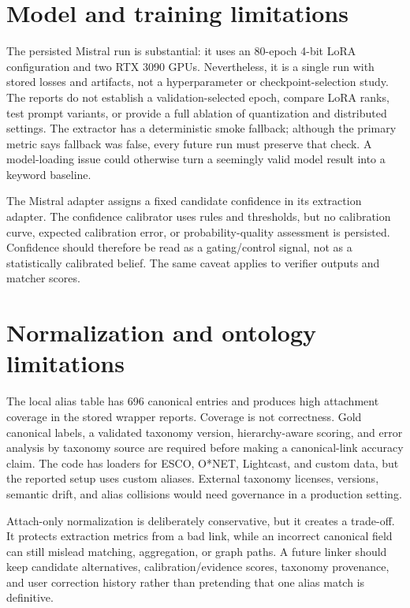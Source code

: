 \section{Model and training limitations}

The persisted Mistral run is substantial: it uses an 80-epoch 4-bit LoRA configuration and two RTX 3090 GPUs. Nevertheless, it is a single run with stored losses and artifacts, not a hyperparameter or checkpoint-selection study. The reports do not establish a validation-selected epoch, compare LoRA ranks, test prompt variants, or provide a full ablation of quantization and distributed settings. The extractor has a deterministic smoke fallback; although the primary metric says fallback was false, every future run must preserve that check. A model-loading issue could otherwise turn a seemingly valid model result into a keyword baseline.

The Mistral adapter assigns a fixed candidate confidence in its extraction adapter. The confidence calibrator uses rules and thresholds, but no calibration curve, expected calibration error, or probability-quality assessment is persisted. Confidence should therefore be read as a gating/control signal, not as a statistically calibrated belief. The same caveat applies to verifier outputs and matcher scores.

\section{Normalization and ontology limitations}

The local alias table has 696 canonical entries and produces high attachment coverage in the stored wrapper reports. Coverage is not correctness. Gold canonical labels, a validated taxonomy version, hierarchy-aware scoring, and error analysis by taxonomy source are required before making a canonical-link accuracy claim. The code has loaders for ESCO, O*NET, Lightcast, and custom data, but the reported setup uses custom aliases. External taxonomy licenses, versions, semantic drift, and alias collisions would need governance in a production setting.

Attach-only normalization is deliberately conservative, but it creates a trade-off. It protects extraction metrics from a bad link, while an incorrect canonical field can still mislead matching, aggregation, or graph paths. A future linker should keep candidate alternatives, calibration/evidence scores, taxonomy provenance, and user correction history rather than pretending that one alias match is definitive.

